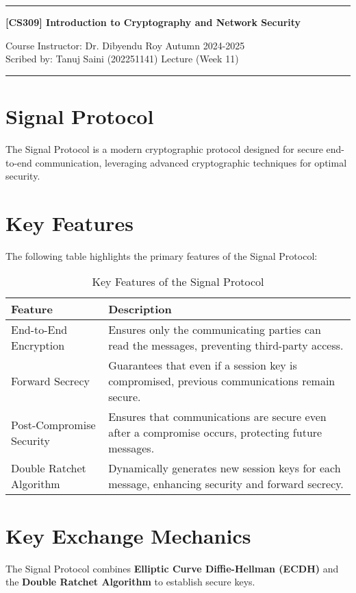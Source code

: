 \documentclass[11pt]{article}
\begin{document}
\noindent
\rule{\textwidth}{1pt}
\begin{center}
{\bf [CS309] Introduction to Cryptography and Network Security}
\end{center}
Course Instructor: Dr. Dibyendu Roy \hfill Autumn 2024-2025\\
Scribed by: Tanuj Saini (202251141) \hfill Lecture (Week 11)
\\
\rule{\textwidth}{1pt}


\section{Signal Protocol}
The Signal Protocol is a modern cryptographic protocol designed for secure end-to-end communication, leveraging advanced cryptographic techniques for optimal security.

\section{Key Features}
The following table highlights the primary features of the Signal Protocol:

\begin{table}[h!]
\centering
\begin{tabular}{|p{4cm}|p{8cm}|}
\hline
\textbf{Feature}                 & \textbf{Description}                                                                                     \\ \hline
End-to-End Encryption            & Ensures only the communicating parties can read the messages, preventing third-party access.             \\ \hline
Forward Secrecy                  & Guarantees that even if a session key is compromised, previous communications remain secure.             \\ \hline
Post-Compromise Security         & Ensures that communications are secure even after a compromise occurs, protecting future messages.       \\ \hline
Double Ratchet Algorithm         & Dynamically generates new session keys for each message, enhancing security and forward secrecy.         \\ \hline
\end{tabular}
\caption{Key Features of the Signal Protocol}
\end{table}

\section{Key Exchange Mechanics}
The Signal Protocol combines \textbf{Elliptic Curve Diffie-Hellman (ECDH)} and the \textbf{Double Ratchet Algorithm} to establish secure keys.
\end{document}
